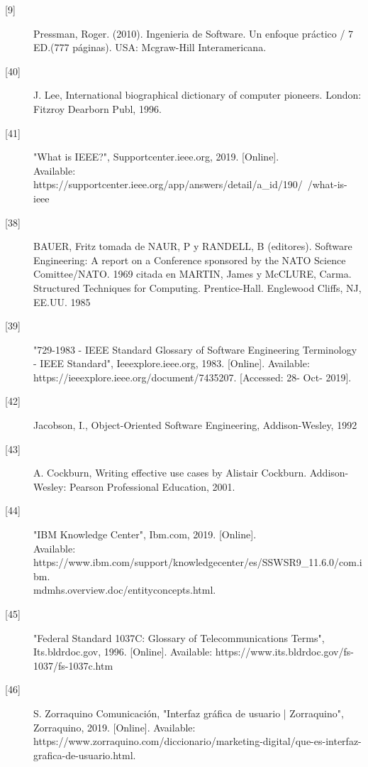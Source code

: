 \begin{description}
		\item[\hypertarget{b09}{[9]}] Pressman, Roger. (2010). Ingenieria de Software. Un enfoque práctico / 7 ED.(777 páginas). USA: Mcgraw-Hill Interamericana.
		
		\item[\hypertarget{b40}{[40]}] J. Lee, International biographical dictionary of computer pioneers. London: Fitzroy Dearborn Publ, 1996.
		
		\item[\hypertarget{b41}{[41]}] "What is IEEE?", Supportcenter.ieee.org, 2019. [Online].\\
		Available: https://supportcenter.ieee.org/app/answers/detail/a\_id/190/~/what-is-ieee
		
		\item[\hypertarget{b38}{[38]}] BAUER, Fritz tomada de NAUR, P y RANDELL, B (editores). Software Engineering: A report on a Conference sponsored by the NATO Science Comittee/NATO. 1969 citada en MARTIN, James y McCLURE, Carma. Structured
		Techniques for Computing. Prentice-Hall. Englewood Cliffs, NJ, EE.UU. 1985 
		
		\item[\hypertarget{b39}{[39]}] "729-1983 - IEEE Standard Glossary of Software Engineering Terminology - IEEE Standard", Ieeexplore.ieee.org, 1983. [Online]. Available: https://ieeexplore.ieee.org/document/7435207. [Accessed: 28- Oct- 2019].
		
		\item[\hypertarget{b42}{[42]}] Jacobson, I., Object-Oriented Software Engineering, Addison-Wesley, 1992
		
		\item[\hypertarget{b43}{[43]}] A. Cockburn, Writing effective use cases by Alistair Cockburn. Addison-Wesley: Pearson Professional Education, 2001.
		
		\item[\hypertarget{b44}{[44]}] "IBM Knowledge Center", Ibm.com, 2019. [Online].\\ Available: https://www.ibm.com/support/knowledgecenter/es/SSWSR9\_11.6.0/com.ibm.\\mdmhs.overview.doc/entityconcepts.html.
		
		\item[\hypertarget{b45}{[45]}] "Federal Standard 1037C: Glossary of Telecommunications Terms", Its.bldrdoc.gov, 1996. [Online]. Available: https://www.its.bldrdoc.gov/fs-1037/fs-1037c.htm
		
		\item[\hypertarget{b46}{[46]}] S. Zorraquino Comunicación, "Interfaz gráfica de usuario | Zorraquino", Zorraquino, 2019. [Online]. Available: https://www.zorraquino.com/diccionario/marketing-digital/que-es-interfaz-grafica-de-usuario.html.
		

\end{description}
